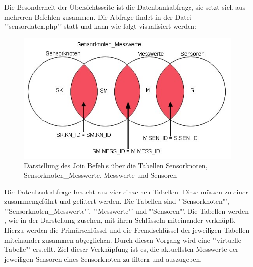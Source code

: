 Die Besonderheit der Übersichtsseite ist die Datenbankabfrage, sie setzt sich aus mehreren Befehlen zusammen. Die Abfrage findet in der Datei "'sensordaten.php"' statt und kann wie folgt visualisiert werden:
\begin{figure}[htp]
	\includegraphics[width=\textwidth]{Bilder/Kapitel4/uebersichtjoin.jpg}
	\caption[Mengendarstellung der Übersichtsseite]{ Darstellung des Join Befehls über die Tabellen Sensorknoten, Sensorknoten\_Messwerte, Messwerte und Sensoren}
	\label{fig:Kapitel4/uebersichtjoin.jpg}
\end{figure}
Die Datenbankabfrage besteht aus vier einzelnen Tabellen. Diese müssen zu einer zusammengeführt und gefiltert werden. Die Tabellen sind "'Sensorknoten"', "'Sensorknoten\_Messwerte"', "'Messwerte"' und "'Sensoren"'. Die Tabellen werden , wie in der Darstellung zusehen, mit ihren Schlüsseln miteinander verknüpft. Hierzu werden die Primärschlüssel und die Fremdschlüssel der jeweiligen Tabellen miteinander zusammen abgeglichen. Durch diesen Vorgang wird eine "'virtuelle Tabelle"' erstellt. Ziel dieser Verknüpfung ist es, die aktuellsten Messwerte der jeweiligen Sensoren eines Sensorknoten zu filtern und auszugeben.


